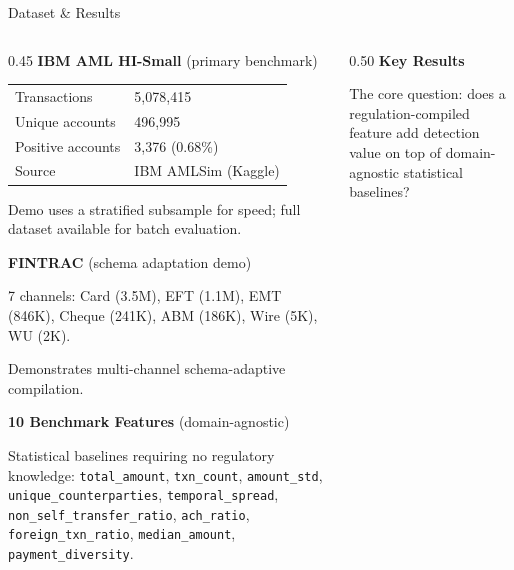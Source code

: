 \documentclass[10pt, aspectratio=169]{beamer}
\begin{document}
\begin{frame}{Dataset \& Results}

\begin{columns}[T]
\begin{column}{0.45\textwidth}
  \textbf{IBM AML HI-Small} {\scriptsize (primary benchmark)}
  \vspace{0.3em}

  \scriptsize
  \begin{tabular}{ll}
    \toprule
    Transactions & 5,078,415 \\
    Unique accounts & 496,995 \\
    Positive accounts & 3,376 (0.68\%) \\
    Source & IBM AMLSim (Kaggle) \\
    \bottomrule
  \end{tabular}

  \vspace{0.3em}
  {\tiny Demo uses a stratified subsample for speed; full dataset available for batch evaluation.}

  \vspace{0.5em}
  \textbf{FINTRAC} {\scriptsize (schema adaptation demo)}
  \vspace{0.3em}

  \scriptsize 7 channels: Card (3.5M), EFT (1.1M), EMT (846K), Cheque (241K), ABM (186K), Wire (5K), WU (2K).

  Demonstrates multi-channel schema-adaptive compilation.

  \vspace{0.5em}
  \textbf{10 Benchmark Features} {\scriptsize (domain-agnostic)}

  \scriptsize Statistical baselines requiring no regulatory knowledge: \texttt{total\_amount}, \texttt{txn\_count}, \texttt{amount\_std}, \texttt{unique\_counterparties}, \texttt{temporal\_spread}, \texttt{non\_self\_transfer\_ratio}, \texttt{ach\_ratio}, \texttt{foreign\_txn\_ratio}, \texttt{median\_amount}, \texttt{payment\_diversity}.
\end{column}

\begin{column}{0.50\textwidth}
  \textbf{Key Results}
  \vspace{0.3em}

  \scriptsize
  The core question: does a regulation-compiled feature add detection value on top of domain-agnostic statistical baselines?


\end{column}
\end{columns}
\end{frame}
\end{document}
